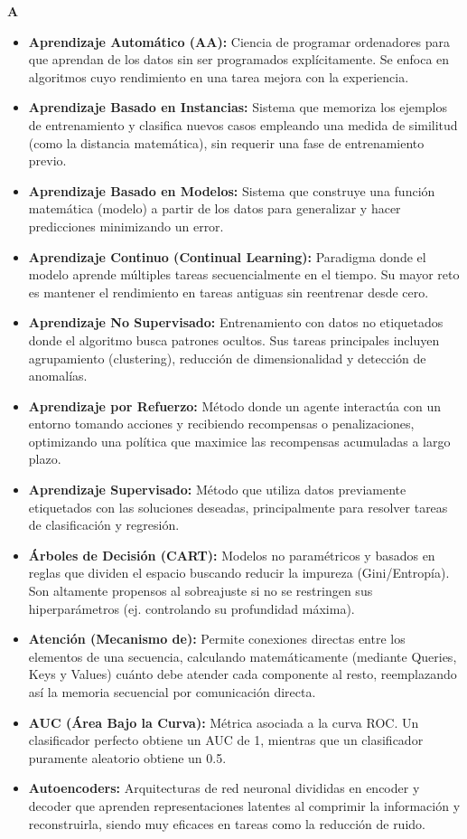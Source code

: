 \documentclass[12pt]{book} %
\providecommand{\tightlist}{%
  \setlength{\itemsep}{0pt}\setlength{\parskip}{0pt}}
\begin{document}
\textbf{A}

\begin{itemize}
\tightlist
\item
  \textbf{Aprendizaje Automático (AA):} Ciencia de programar ordenadores
  para que aprendan de los datos sin ser programados explícitamente. Se
  enfoca en algoritmos cuyo rendimiento en una tarea mejora con la
  experiencia.
\item
  \textbf{Aprendizaje Basado en Instancias:} Sistema que memoriza los
  ejemplos de entrenamiento y clasifica nuevos casos empleando una
  medida de similitud (como la distancia matemática), sin requerir una
  fase de entrenamiento previo.
\item
  \textbf{Aprendizaje Basado en Modelos:} Sistema que construye una
  función matemática (modelo) a partir de los datos para generalizar y
  hacer predicciones minimizando un error.
\item
  \textbf{Aprendizaje Continuo (Continual Learning):} Paradigma donde el
  modelo aprende múltiples tareas secuencialmente en el tiempo. Su mayor
  reto es mantener el rendimiento en tareas antiguas sin reentrenar
  desde cero.
\item
  \textbf{Aprendizaje No Supervisado:} Entrenamiento con datos no
  etiquetados donde el algoritmo busca patrones ocultos. Sus tareas
  principales incluyen agrupamiento (clustering), reducción de
  dimensionalidad y detección de anomalías.
\item
  \textbf{Aprendizaje por Refuerzo:} Método donde un agente interactúa
  con un entorno tomando acciones y recibiendo recompensas o
  penalizaciones, optimizando una política que maximice las recompensas
  acumuladas a largo plazo.
\item
  \textbf{Aprendizaje Supervisado:} Método que utiliza datos previamente
  etiquetados con las soluciones deseadas, principalmente para resolver
  tareas de clasificación y regresión.
\item
  \textbf{Árboles de Decisión (CART):} Modelos no paramétricos y basados
  en reglas que dividen el espacio buscando reducir la impureza
  (Gini/Entropía). Son altamente propensos al sobreajuste si no se
  restringen sus hiperparámetros (ej. controlando su profundidad
  máxima).
\item
  \textbf{Atención (Mecanismo de):} Permite conexiones directas entre
  los elementos de una secuencia, calculando matemáticamente (mediante
  Queries, Keys y Values) cuánto debe atender cada componente al resto,
  reemplazando así la memoria secuencial por comunicación directa.
\item
  \textbf{AUC (Área Bajo la Curva):} Métrica asociada a la curva ROC. Un
  clasificador perfecto obtiene un AUC de 1, mientras que un
  clasificador puramente aleatorio obtiene un 0.5.
\item
  \textbf{Autoencoders:} Arquitecturas de red neuronal divididas en
  encoder y decoder que aprenden representaciones latentes al comprimir
  la información y reconstruirla, siendo muy eficaces en tareas como la
  reducción de ruido.
\end{itemize}
\end{document}
